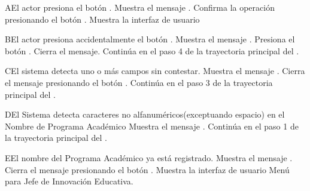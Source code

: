 \begin{UCtrayectoriaA}{A}{El actor presiona el botón .}
    \UCpaso Muestra el mensaje .
    \UCpaso[\UCactor] Confirma la operación presionando el botón .
    \UCpaso Muestra la interfaz de usuario 
\end{UCtrayectoriaA}
\begin{UCtrayectoriaA}{B}{El actor presiona accidentalmente el botón .}
    \UCpaso Muestra el mensaje .
    \UCpaso[\UCactor] Presiona el botón .
    \UCpaso Cierra el mensaje.
    \UCpaso Continúa en el paso 4 de la trayectoria principal del .
\end{UCtrayectoriaA}
\begin{UCtrayectoriaA}{C}{El sistema detecta uno o más campos sin contestar.}
    \UCpaso Muestra el mensaje .
    \UCpaso[\UCactor] Cierra el mensaje presionando el botón .
    \UCpaso Continúa en el paso 3 de la trayectoria principal del .
\end{UCtrayectoriaA}
\begin{UCtrayectoriaA}{D}{El Sistema detecta caracteres no alfanuméricos(exceptuando espacio) en el Nombre de Programa Académico}
    \UCpaso Muestra el mensaje .
    \UCpaso Continúa en el paso 1 de la trayectoria principal del .
\end{UCtrayectoriaA}

\begin{UCtrayectoriaA}{E}{El nombre del Programa Académico ya está registrado.}
    \UCpaso Muestra el mensaje .
    \UCpaso[\UCactor] Cierra el mensaje presionando el botón .
\UCpaso Muestra la interfaz de usuario Menú para Jefe de Innovación Educativa.
\end{UCtrayectoriaA}


